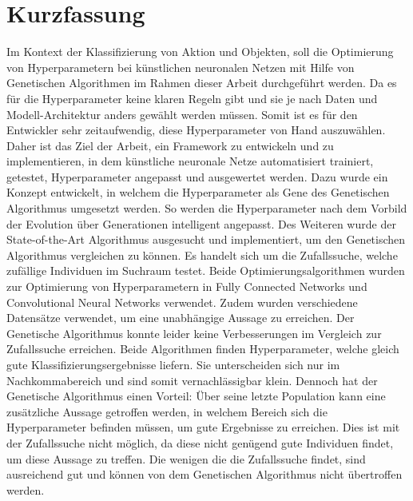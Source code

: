 \chapter*{Kurzfassung}
\label{sec:Kurzfasssung}
Im Kontext der Klassifizierung von Aktion und Objekten, soll die Optimierung von Hyperparametern bei künstlichen neuronalen Netzen mit Hilfe von Genetischen Algorithmen im Rahmen dieser Arbeit durchgeführt werden. Da es für die Hyperparameter keine klaren Regeln gibt und sie je nach Daten und Modell-Architektur anders gewählt werden müssen. Somit ist es für den Entwickler sehr zeitaufwendig, diese Hyperparameter von Hand auszuwählen. Daher ist das Ziel der Arbeit, ein Framework zu entwickeln und zu implementieren, in dem künstliche neuronale Netze automatisiert trainiert, getestet, Hyperparameter angepasst und ausgewertet werden. Dazu wurde ein Konzept entwickelt, in welchem die Hyperparameter als Gene des Genetischen Algorithmus umgesetzt werden. So werden die Hyperparameter nach dem Vorbild der Evolution über Generationen intelligent angepasst. Des Weiteren wurde der State-of-the-Art Algorithmus ausgesucht und implementiert, um den Genetischen Algorithmus vergleichen zu können. Es handelt sich um die Zufallssuche, welche zufällige Individuen im Suchraum testet. Beide Optimierungsalgorithmen wurden zur Optimierung von Hyperparametern in Fully Connected Networks und Convolutional Neural Networks verwendet. Zudem wurden verschiedene Datensätze verwendet, um eine unabhängige Aussage zu erreichen. Der Genetische Algorithmus konnte leider keine Verbesserungen im Vergleich zur Zufallssuche erreichen. Beide Algorithmen finden Hyperparameter, welche gleich gute Klassifizierungsergebnisse liefern. Sie unterscheiden sich nur im Nachkommabereich und sind somit vernachlässigbar klein. Dennoch hat der Genetische Algorithmus einen Vorteil: Über seine letzte Population kann eine zusätzliche Aussage getroffen werden, in welchem Bereich sich die Hyperparameter befinden müssen, um gute Ergebnisse zu erreichen. Dies ist mit der Zufallssuche nicht möglich, da diese nicht genügend gute Individuen findet, um diese Aussage zu treffen. Die wenigen die die Zufallssuche findet, sind ausreichend gut und können von dem Genetischen Algorithmus nicht übertroffen werden.
